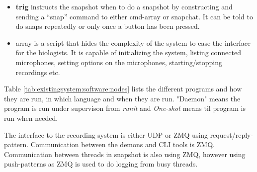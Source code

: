 \begin{itemize}
	
	\item \textbf{trig} instructs the snapshot when to do a snapshot by constructing and sending a “snap” command to either cmd-array or snapchat. It can be told to do snaps repeatedly or only once a button has been pressed.

	\item {array} is a script that hides the complexity of the system to ease the interface for the biologists. It is capable of initializing the system, listing connected microphones, setting options on the microphones, starting/stopping recordings etc.

\end{itemize}


Table \ref{tab:existingsystem:software:nodes} lists the different programs and how they are run, in which language and when they are run. "Daemon" means the program is run under supervison from \textit{runit} and \textit{One-shot} means til program is run when needed.

\begin{table}[h!]
\centering
{}
\caption{My caption}
\label{my-label}
\end{table}



The interface to the recording system is either UDP or ZMQ using request/reply-pattern. Communication between the demons and CLI tools is ZMQ. Communication between threads in snapshot is also using ZMQ, however using push-patterns as ZMQ is used to do logging from busy threads.

